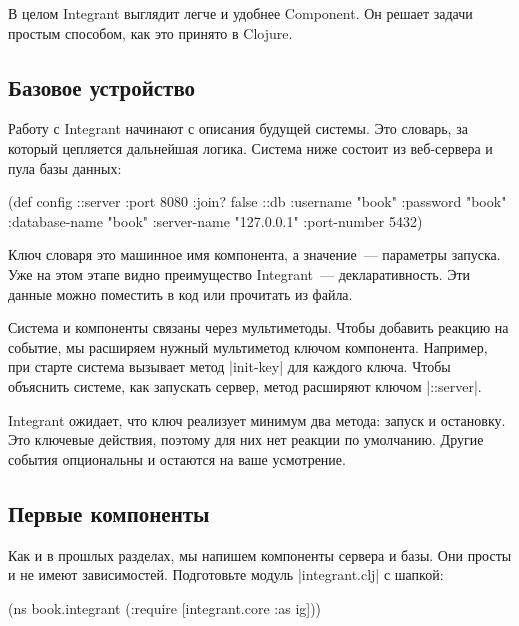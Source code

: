 В целом Integrant выглядит легче и удобнее Component. Он
решает задачи простым способом, как это принято в Clojure.

\subsection{Базовое устройство}

Работу с Integrant начинают с описания будущей системы. Это словарь, за
который цепляется дальнейшая логика. Система ниже состоит из веб-сервера и пула
базы данных:

\begin{english}
  \begin{clojure}
(def config
  {::server {:port 8080 :join? false}
   ::db {:username      "book"
         :password      "book"
         :database-name "book"
         :server-name   "127.0.0.1"
         :port-number   5432}})
  \end{clojure}
\end{english}

Ключ словаря это машинное имя компонента, а значение~--- параметры запуска. Уже
на этом этапе видно преимущество Integrant~--- декларативность. Эти
данные можно поместить в код или прочитать из файла.

Система и компоненты связаны через мультиметоды. Чтобы добавить реакцию на
событие, мы расширяем нужный мультиметод ключом компонента. Например, при старте
система вызывает метод \spverb|init-key| для каждого ключа. Чтобы объяснить
системе, как запускать сервер, метод расширяют ключом \spverb|::server|.

Integrant ожидает, что ключ реализует минимум два метода: запуск и
остановку. Это ключевые действия, поэтому для них нет реакции по
умолчанию. Другие события опциональны и остаются на ваше усмотрение.

\subsection{Первые компоненты}

Как и в прошлых разделах, мы напишем компоненты сервера и базы. Они просты и не
имеют зависимостей. Подготовьте модуль \spverb|integrant.clj| с шапкой:

\begin{english}
  \begin{clojure}
(ns book.integrant
  (:require [integrant.core :as ig]))
  \end{clojure}
\end{english}

